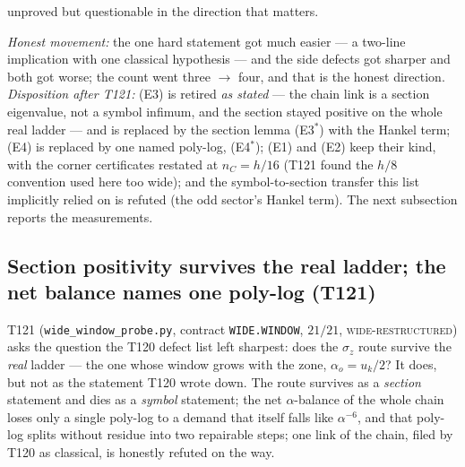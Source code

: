 \documentclass[11pt,a4paper]{article}
\begin{document}
\begin{keybox}
\begin{enumerate}[leftmargin=1.6em]
unproved but questionable in the direction that matters.
\end{enumerate}
\emph{Honest movement:} the one hard statement got much easier --- a two-line implication
with one classical hypothesis --- and the side defects got sharper and both got worse; the
count went three $\to$ four, and that is the honest direction.\\[3pt]
\emph{Disposition after T121:} (E3) is retired \emph{as stated} --- the chain link is a
section eigenvalue, not a symbol infimum, and the section stayed positive on the whole real
ladder --- and is replaced by the section lemma (E3$^*$) with the Hankel term; (E4) is
replaced by one named poly-log, (E4$^*$); (E1) and (E2) keep their kind, with the corner
certificates restated at $n_C=h/16$ (T121 found the $h/8$ convention used here too wide);
and the symbol-to-section transfer this list implicitly relied on is refuted (the odd
sector's Hankel term). The next subsection reports the measurements.
\end{keybox}

\subsection{Section positivity survives the real ladder; the net balance names one poly-log (T121)}
T121 (\texttt{wide\_window\_probe.py}, contract \texttt{WIDE.WINDOW}, $21/21$,
\textsc{wide-restructured}) asks the question the T120 defect list left sharpest: does the
$\sigma_z$ route survive the \emph{real} ladder --- the one whose window grows with the zone,
$\alpha_o=u_k/2$? It does, but not as the statement T120 wrote down. The route survives as a
\emph{section} statement and dies as a \emph{symbol} statement; the net $\alpha$-balance of the
whole chain loses only a single poly-log to a demand that itself falls like $\alpha^{-6}$, and
that poly-log splits without residue into two repairable steps; one link of the chain, filed by
T120 as classical, is honestly refuted on the way.
\end{document}

